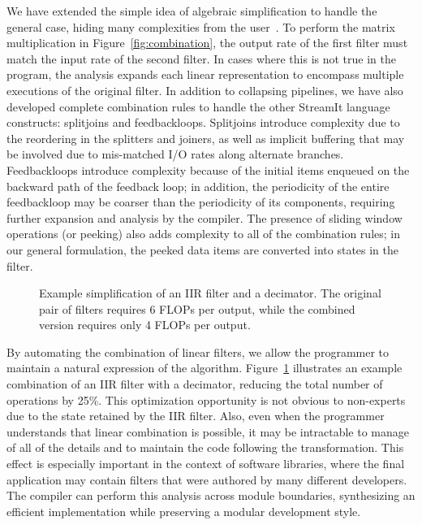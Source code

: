 We have extended the simple idea of algebraic simplification to handle
the general case, hiding many complexities from the
user~\cite{agrawal-cases05}.  To perform the matrix multiplication
in Figure~\ref{fig:combination}, the output rate of the first filter
must match the input rate of the second filter.  In cases where this
is not true in the program, the analysis expands each linear
representation to encompass multiple executions of the original
filter.  In addition to collapsing pipelines, we have also developed
complete combination rules to handle the other StreamIt language
constructs: splitjoins and feedbackloops.  Splitjoins introduce
complexity due to the reordering in the splitters and joiners, as well
as implicit buffering that may be involved due to mis-matched I/O
rates along alternate branches.  Feedbackloops introduce complexity
because of the initial items enqueued on the backward path of the
feedback loop; in addition, the periodicity of the entire feedbackloop
may be coarser than the periodicity of its components, requiring
further expansion and analysis by the compiler.  The presence of
sliding window operations (or peeking) also adds complexity to all of
the combination rules; in our general formulation, the peeked data
items are converted into states in the filter.

\begin{figure}[t]
\centering
{}
\caption[Example simplification of an IIR filter and a decimator]{Example 
simplification of an IIR filter and a decimator.  The original pair of
filters requires 6 FLOPs per output, while the combined version
requires only 4 FLOPs per output.\protect\label{fig:combination-example}}
\end{figure}

By automating the combination of linear filters, we allow the
programmer to maintain a natural expression of the algorithm.
Figure~\ref{fig:combination-example} illustrates an example
combination of an IIR filter with a decimator, reducing the total
number of operations by 25\%.  This optimization opportunity is not
obvious to non-experts due to the state retained by the IIR filter.
Also, even when the programmer understands that linear combination is
possible, it may be intractable to manage of all of the details and to
maintain the code following the transformation.  This effect is
especially important in the context of software libraries, where the
final application may contain filters that were authored by many
different developers.  The compiler can perform this analysis across
module boundaries, synthesizing an efficient implementation while
preserving a modular development style.

